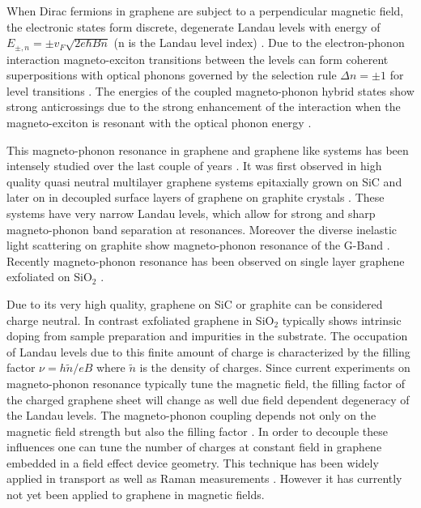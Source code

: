 \documentclass[prl,aps,superscriptaddress,showpacs,reprint]{revtex4-1}
\begin{document}
\label{Intro}  
When Dirac fermions in graphene are subject to a perpendicular magnetic field, the electronic states form discrete, degenerate Landau levels with energy of $E_{\pm, n}=\pm v_F\sqrt{2e\hbar Bn}$ (n is the Landau level index) \cite{neto2009electronic,goerbig2011electronic}. Due to the electron-phonon interaction magneto-exciton transitions between the levels can form coherent superpositions with optical phonons governed by the selection rule $\Delta n=\pm 1$ for level transitions \cite{PhysRevB.84.235138}. The energies of the coupled magneto-phonon hybrid states show strong anticrossings due to the strong enhancement of the interaction when the magneto-exciton is resonant with the optical phonon energy \cite{ando2007magnetic,goerbig2007filling,goerbig2011electronic}. 

This magneto-phonon resonance in graphene and graphene like systems has been intensely studied over the last couple of years \cite{goler2012raman}. It was first observed in high quality quasi neutral multilayer graphene systems epitaxially grown on SiC \cite{faugeras2009tuning} and later on in decoupled surface layers of graphene on graphite crystals \cite{kuhne2012polarization,faugeras2011magneto,yan2010observation}. These systems have very narrow Landau levels, which allow for strong and sharp magneto-phonon band separation at resonances. Moreover the diverse inelastic light scattering on graphite show magneto-phonon resonance of the G-Band \cite{PhysRevLett.110.227402,kossacki2011electronic,PhysRevB.80.241404,yan2010observation}. Recently magneto-phonon resonance has been observed on single layer graphene exfoliated on SiO$_2$ \cite{PhysRevLett.110.227402,kossacki2012circular}.

Due to its very high quality, graphene on SiC or graphite can be considered charge neutral. In contrast exfoliated graphene in SiO$_2$ typically shows intrinsic doping from sample preparation  and impurities in the substrate. The occupation of Landau levels due to this finite amount of charge is characterized by the filling factor $\nu = h\widetilde{n}/eB$ where $\widetilde{n}$ is the density of charges. Since current experiments on magneto-phonon resonance typically tune the magnetic field, the filling factor of the charged graphene sheet will change as well due field dependent degeneracy of the Landau levels. The magneto-phonon coupling depends not only on the magnetic field strength but also the filling factor \cite{goerbig2007filling}. In order to decouple these influences one can tune the number of charges at constant field in graphene embedded in a field effect device geometry. This technique has been widely applied in transport \cite{novoselov2004electric,novoselov2005two,zhang2005experimental} as well as Raman measurements \cite{pisana2007breakdown,yan2007electric,stampfer2007raman}. However it has currently not yet been applied to graphene in magnetic fields.
\end{document}
